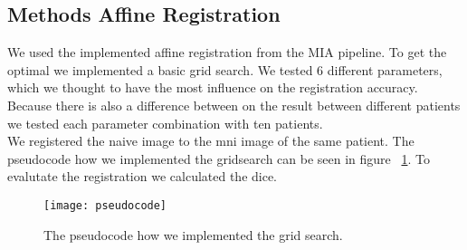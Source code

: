 \subsection{Methods Affine Registration}
We used the implemented affine registration from the MIA pipeline. To get the optimal we implemented a basic grid search. We tested 6 different parameters, which we thought to have the most influence on the registration accuracy. Because there is also a difference between on the result between different patients we tested each parameter combination with ten patients. \\ We registered the naive image to the mni image of the same patient. The pseudocode how we implemented the gridsearch can be seen in figure ~\ref{fig:pseudocode_gridsearch}. To evalutate the registration we calculated the dice.

\begin{figure}[!h]
	\centering
	\texttt{[image: pseudocode]}
	\caption{The pseudocode how we implemented the grid search.}
	\label{fig:pseudocode_gridsearch}
\end{figure}
